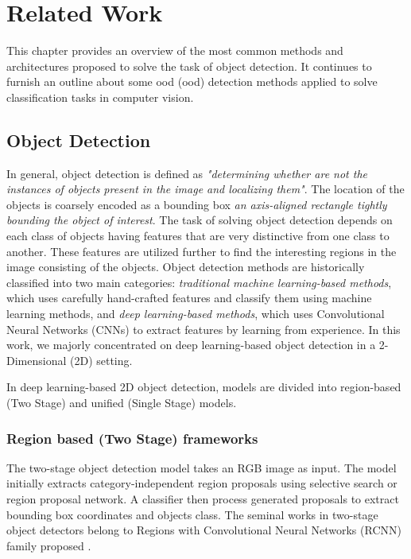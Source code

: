 

    \justifying
    \chapter{Related Work}
    \label{related_work}

    This chapter provides an overview of the most common methods and architectures proposed to solve the task of object detection. It continues to furnish an outline about some \acrlong{ood} (\acrshort{ood}) detection methods applied to solve classification tasks in computer vision.

    \section{Object Detection}
    \label{OD_methods}
    In general, object detection is defined as \textit{"determining whether are not the instances of objects present in the image and localizing them"}. The location of the objects is coarsely encoded as a bounding box \textit{an axis-aligned rectangle tightly bounding the object of interest}. The task of solving object detection depends on each class of objects having features that are very distinctive from one class to another. These features are utilized further to find the interesting regions in the image consisting of the objects. Object detection methods are historically classified into two main categories: \textit{traditional machine learning-based methods}, which uses carefully hand-crafted features and classify them using machine learning methods, and \textit{deep learning-based methods}, which uses Convolutional Neural Networks (CNNs) to extract features by learning from experience. In this work, we majorly concentrated on deep learning-based object detection in a 2-Dimensional (2D) setting.
    
    In deep learning-based 2D object detection, models are divided into region-based (Two Stage) and unified (Single Stage) models.
    
    \subsection{Region based (Two Stage) frameworks}
    The two-stage object detection model takes an RGB image as input. The model initially extracts category-independent region proposals using selective search or region proposal network. A classifier then process generated proposals to extract bounding box coordinates and objects class. The seminal works in two-stage object detectors belong to Regions with Convolutional Neural Networks (RCNN) family proposed \cite{Girshick2014}. 
    
